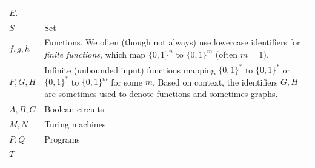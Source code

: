 \begin{longtable}[]{@{}ll@{}}
\begin{minipage}[t]{0.83\columnwidth}
\(E\).\strut
\end{minipage}\tabularnewline
\begin{minipage}[t]{0.11\columnwidth}\raggedright
\(S\)\strut
\end{minipage} & \begin{minipage}[t]{0.83\columnwidth}\raggedright
Set\strut
\end{minipage}\tabularnewline
\begin{minipage}[t]{0.11\columnwidth}\raggedright
\(f,g,h\)\strut
\end{minipage} & \begin{minipage}[t]{0.83\columnwidth}\raggedright
Functions. We often (though not always) use lowercase identifiers for
\emph{finite functions}, which map \(\{0,1\}^n\) to \(\{0,1\}^m\) (often
\(m=1\)).\strut
\end{minipage}\tabularnewline
\begin{minipage}[t]{0.11\columnwidth}\raggedright
\(F,G,H\)\strut
\end{minipage} & \begin{minipage}[t]{0.83\columnwidth}\raggedright
Infinite (unbounded input) functions mapping \(\{0,1\}^*\) to
\(\{0,1\}^*\) or \(\{0,1\}^*\) to \(\{0,1\}^m\) for some \(m\). Based on
context, the identifiers \(G,H\) are sometimes used to denote functions
and sometimes graphs.\strut
\end{minipage}\tabularnewline
\begin{minipage}[t]{0.11\columnwidth}\raggedright
\(A,B,C\)\strut
\end{minipage} & \begin{minipage}[t]{0.83\columnwidth}\raggedright
Boolean circuits\strut
\end{minipage}\tabularnewline
\begin{minipage}[t]{0.11\columnwidth}\raggedright
\(M,N\)\strut
\end{minipage} & \begin{minipage}[t]{0.83\columnwidth}\raggedright
Turing machines\strut
\end{minipage}\tabularnewline
\begin{minipage}[t]{0.11\columnwidth}\raggedright
\(P,Q\)\strut
\end{minipage} & \begin{minipage}[t]{0.83\columnwidth}\raggedright
Programs\strut
\end{minipage}\tabularnewline
\begin{minipage}[t]{0.11\columnwidth}\raggedright
\(T\)\strut
\end{minipage} & \begin{minipage}[t]{0.83\columnwidth}\raggedright

\end{minipage}
\end{longtable}
